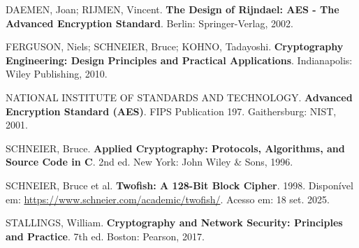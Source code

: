 \documentclass[12pt,a4paper,oneside]{article}
\begin{document}
DAEMEN, Joan; RIJMEN, Vincent. \textbf{The Design of Rijndael: AES - The Advanced Encryption Standard}. Berlin: Springer-Verlag, 2002.

FERGUSON, Niels; SCHNEIER, Bruce; KOHNO, Tadayoshi. \textbf{Cryptography Engineering: Design Principles and Practical Applications}. Indianapolis: Wiley Publishing, 2010.

NATIONAL INSTITUTE OF STANDARDS AND TECHNOLOGY. \textbf{Advanced Encryption Standard (AES)}. FIPS Publication 197. Gaithersburg: NIST, 2001.

SCHNEIER, Bruce. \textbf{Applied Cryptography: Protocols, Algorithms, and Source Code in C}. 2nd ed. New York: John Wiley \& Sons, 1996.

SCHNEIER, Bruce et al. \textbf{Twofish: A 128-Bit Block Cipher}. 1998. Disponível em: \url{https://www.schneier.com/academic/twofish/}. Acesso em: 18 set. 2025.

STALLINGS, William. \textbf{Cryptography and Network Security: Principles and Practice}. 7th ed. Boston: Pearson, 2017.
\end{document}
